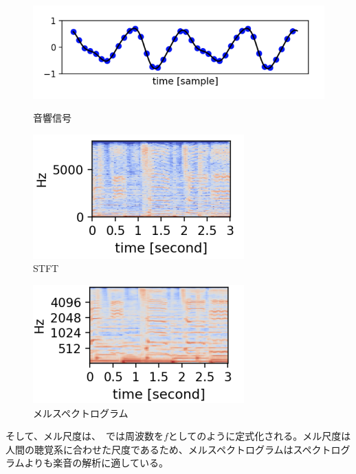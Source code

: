 \begin{figure}[b]
\centering
\begin{minipage}[b]{0.48\columnwidth}
\centering
\includegraphics[width=\columnwidth]{figure/audio_signal.png}
\caption{音響信号}
\label{fig:audio_signal}
\end{minipage}
\begin{minipage}[b]{0.48\columnwidth}
\centering
\includegraphics[width=\columnwidth]{figure/stft.png}
\caption{STFT}
\label{fig:STFT}
\end{minipage}
\end{figure}

\clearpage

\begin{figure}[t]
\centering
\includegraphics[width=0.5\columnwidth]{figure/mel.png}
\caption{メルスペクトログラム}
\label{fig:mel}
\end{figure}

そして、メル尺度は、~\cite{mel}では周波数を$f$としてのように定式化される。メル尺度は人間の聴覚系に合わせた尺度であるため、メルスペクトログラムはスペクトログラムよりも楽音の解析に適している。

